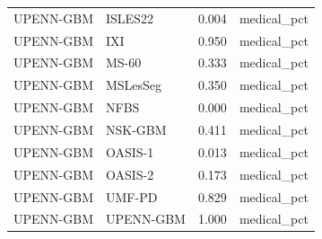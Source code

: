 \begin{tabular}{llrl}
UPENN-GBM & ISLES22 & 0.004 & medical\_pct \\
UPENN-GBM & IXI & 0.950 & medical\_pct \\
UPENN-GBM & MS-60 & 0.333 & medical\_pct \\
UPENN-GBM & MSLesSeg & 0.350 & medical\_pct \\
UPENN-GBM & NFBS & 0.000 & medical\_pct \\
UPENN-GBM & NSK-GBM & 0.411 & medical\_pct \\
UPENN-GBM & OASIS-1 & 0.013 & medical\_pct \\
UPENN-GBM & OASIS-2 & 0.173 & medical\_pct \\
UPENN-GBM & UMF-PD & 0.829 & medical\_pct \\
UPENN-GBM & UPENN-GBM & 1.000 & medical\_pct \\
\bottomrule
\end{tabular}
